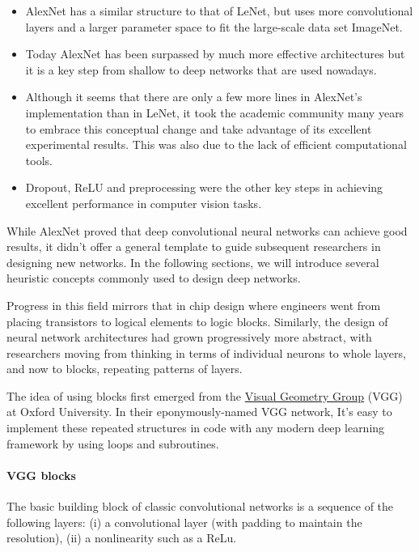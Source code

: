 \begin{itemize}
    \item AlexNet has a similar structure to that of LeNet, but uses more convolutional layers and a larger parameter space to fit the large-scale data set ImageNet.
    \item Today AlexNet has been surpassed by much more effective architectures but it is a key step from shallow to deep networks that are used nowadays.
    \item Although it seems that there are only a few more lines in AlexNet's implementation than in LeNet, it took the academic community many years to embrace this conceptual change and take advantage of its excellent experimental results. This was also due to the lack of efficient computational tools.
    \item Dropout, ReLU and preprocessing were the other key steps in achieving excellent performance in computer vision tasks.
\end{itemize}


While AlexNet proved that deep convolutional neural networks can achieve good results, it didn't offer a general template to guide subsequent researchers in designing new networks.  In the following sections, we will introduce several heuristic concepts commonly used to design deep networks.

Progress in this field mirrors that in chip design where engineers went from placing transistors to logical elements to logic blocks. Similarly, the design of neural network architectures  had grown progressively more abstract, with researchers moving from thinking in terms of individual neurons to whole layers, and now to blocks, repeating patterns of layers.

The idea of using blocks first emerged from the \href{http://www.robots.ox.ac.uk/~vgg/}{Visual Geometry Group} (VGG) at Oxford University. In their eponymously-named VGG network, It's easy to implement these repeated structures in code with any modern deep learning framework by using loops and subroutines. 

\paragraph{VGG blocks}

The basic building block of classic convolutional networks is a sequence of the following layers: (i) a convolutional layer  (with padding to maintain the resolution), (ii) a nonlinearity such as a ReLu.

